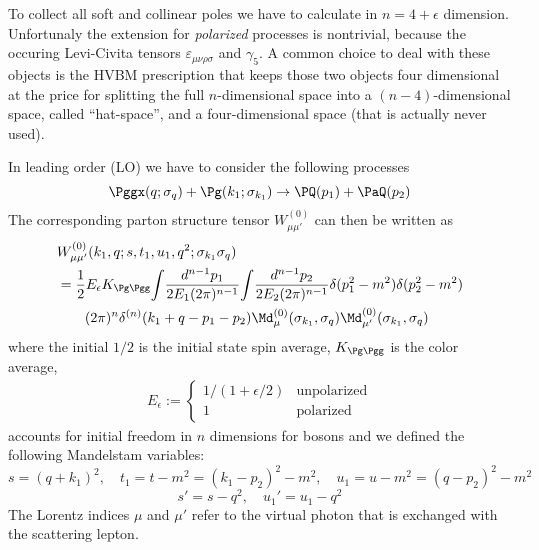 To collect all soft and collinear poles we have to calculate in $n=4+\epsilon$ dimension. Unfortunaly the extension for \textit{polarized} processes is nontrivial, because the occuring Levi-Civita tensors $\varepsilon_{\mu\nu\rho\sigma}$ and $\gamma_5$. A common choice to deal with these objects is the HVBM prescription\cite{breitenlohner1977} that keeps those two objects four dimensional at the price for splitting the full $n$-dimensional space into a $(n-4)$-dimensional space, called \enquote{hat-space}, and a four-dimensional space (that is actually never used).

In leading order (LO) we have to consider the following processes
\begin{equation}
\Pggx(q;\sigma_q) + \Pg(k_1;\sigma_{k_1}) \rightarrow \PQ(p_1)+\PaQ(p_2)
\end{equation}
The corresponding parton structure tensor $W_{\mu\mu'}^{(0)}$ can then be written as
\begin{align}
&W_{\mu\mu'}^{(0)}(k_1,q;s,t_1,u_1,q^2;\sigma_{k_1}\sigma_{q})\nonumber\\
 &= \frac 1 2 E_\epsilon K_{\Pg\Pgg}\!\int\!\frac{d^{n-1}p_1}{2E_1(2\pi)^{n-1}}\!\int\!\frac{d^{n-1}p_2}{2E_2(2\pi)^{n-1}}\delta(p_1^2-m^2) \delta(p_2^2-m^2)\nonumber\\
 &\hspace{20pt}(2\pi)^n\delta^{(n)}(k_1+q-p_1-p_2) \Md_{\mu}^{(0)}(\sigma_{k_1},\sigma_q)\Md_{\mu'}^{(0)}(\sigma_{k_1},\sigma_q)
\label{eq:PartonicStructureTensor0}\end{align}
where the initial $1/2$ is the initial state spin average, $K_{\Pg\Pgg}$ is the color average,
\begin{align}
E_\epsilon := \left\{\begin{array}{ll}
1/(1+\epsilon/2) &\text{unpolarized}\\
1 &\text{polarized}
\end{array}\right.
\end{align}
accounts for initial freedom in $n$ dimensions for bosons and we defined the following Mandelstam variables:
\begin{equation}
s = (q+k_1)^2, \quad t_1=t-m^2=(k_1-p_2)^2-m^2, \quad u_1 = u - m^2 = (q-p_2)^2 -m^2
\end{equation}
\begin{equation}
s' = s-q^2,\quad u_1' = u_1 - q^2
\end{equation}
The Lorentz indices $\mu$ and $\mu'$ refer to the virtual photon that is exchanged with the scattering lepton.

